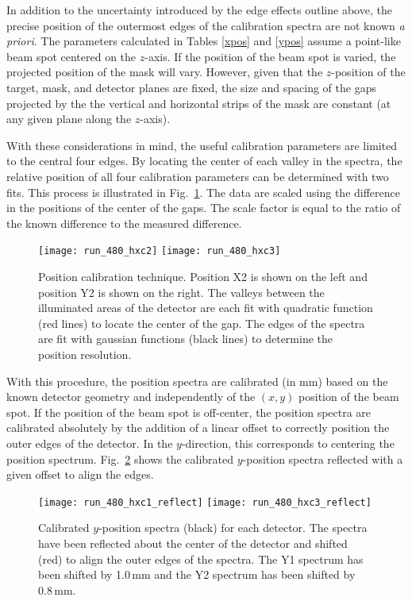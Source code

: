 In addition to the uncertainty introduced by the edge effects outline above, the precise position of the outermost edges of the calibration spectra are not known \textit{a priori}. The parameters calculated in Tables \ref{xpos} and \ref{ypos} assume a point-like beam spot centered on the $z$-axis.  If the position of the beam spot is varied, the projected position of the mask will vary.  However, given that the $z$-position of the target, mask, and detector planes are fixed, the size and spacing of the gaps projected by the the vertical and horizontal strips of the mask are constant (at any given plane along the $z$-axis).

With these considerations in mind, the useful calibration parameters are limited to the central four edges.  By locating the center of each valley in the spectra, the relative position of all four calibration parameters can be determined with two fits. %
 This process is illustrated in Fig.~\ref{hxc}.  The data are scaled using the difference in the positions of the center of the gaps.  The scale factor is equal to the ratio of the known difference to  the measured difference. 
\begin{figure}
\centering
\hspace{\fill}
\texttt{[image: run\_480\_hxc2]}\hspace{\fill}
\texttt{[image: run\_480\_hxc3]} \hspace{\fill}
\caption{Position calibration technique.  Position X2 is shown on the left and position Y2 is shown on the right. The valleys between the illuminated areas of the detector are each fit with quadratic function (red lines) to locate the center of the gap.  The edges of the spectra are fit with gaussian functions (black lines) to determine the position resolution.}
\label{hxc}
\end{figure}

With this procedure, the position spectra are calibrated (in mm) based on the known detector geometry and independently of the $(x,y)$ position of the beam spot.  If the position of the beam spot is off-center, the position spectra are calibrated absolutely by the addition of a linear offset to correctly position the outer edges of the detector.  In the $y$-direction, this corresponds to centering the position spectrum. Fig.~\ref{yposreflect} shows the calibrated $y$-position spectra reflected with a given offset to align the edges.
\begin{figure}
  \centering
  \texttt{[image: run\_480\_hxc1\_reflect]}\hspace{\fill}
  \texttt{[image: run\_480\_hxc3\_reflect]}
   \caption{Calibrated $y$-position spectra (black) for each detector. The spectra have been reflected about the center of the detector and shifted (red) to align the outer edges of the spectra.  The Y1 spectrum has been shifted by 1.0\,mm and the Y2 spectrum has been shifted by 0.8\,mm.}
   \label{yposreflect}
\end{figure}
